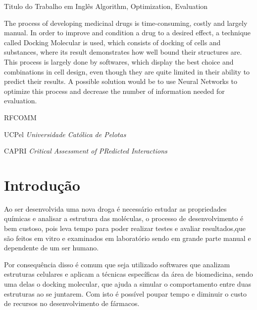 \documentclass[tcc, capa]{texucpel}
\begin{document}
\begin{englishabstract}
  {Titulo do Trabalho em Inglês}
  {Algorithm, Optimization, Evaluation}  
  

The process of developing medicinal drugs is time-consuming, costly and largely manual.
In order to improve and condition a drug to a desired effect, a technique called Docking Molecular is used, which consists of docking of cells and substances, where its result demonstrates how well bound their structures are. \\
This process is largely done by softwares, which display the best choice and combinations in cell design, even though they are quite limited in their ability to predict their results.
A possible solution would be to use Neural Networks to optimize this process and decrease the number of information needed for evaluation.

\end{englishabstract}

\listoffigures

\listoftables

\begin{listofabbrv}{RFCOMM}
		\item[UCPel] \textit{Universidade Cat\'olica de Pelotas}
        \item[CAPRI] \textit{Critical Assessment of PRedicted Interactions}

        
        
\end{listofabbrv}

\tableofcontents

\chapter{Introdução}
Ao ser desenvolvida uma nova droga é necessário estudar as propriedades químicas e analisar a estrutura das moléculas, o processo de desenvolvimento é bem custoso, pois leva tempo para poder realizar testes e avaliar resultados,que são feitos em vitro e examinados em laboratório sendo em grande parte manual e dependente de um ser humano.%

Por consequência disso é comum que seja utilizado softwares que analizam estruturas celulares e aplicam a técnicas específicas da área de biomedicina, sendo uma delas o docking molecular, que ajuda a simular o comportamento entre duas estruturas ao se juntarem.
Com isto é possível poupar tempo e diminuir o custo de recursos no desenvolvimento de fármacos.
\end{document}
